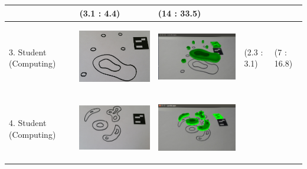 \documentclass[11pt]{article}
\begin{document}
\begin{landscape}
\begin{longtable}{p{}| p{}| p{} | p{} |p{}}
							& (3.1 : 4.4)
							& (14 : 33.5)\\
\hline
3. Student (Computing) & \begin{center}\includegraphics[scale=0.5]{pics/usertesting/3.png}\end{center} 
							& \begin{center}\includegraphics[scale=0.5]{pics/usertesting/3render.png}\end{center} 
							& (2.3 : 3.1)
							& (7 : 16.8)\\
\hline
4. Student (Computing) & \begin{center}\includegraphics[scale=0.5]{pics/usertesting/4.png}\end{center} 
							& \begin{center}\includegraphics[scale=0.5]{pics/usertesting/4render.png}\end{center} 

\end{longtable}
\end{landscape}
\end{document}
